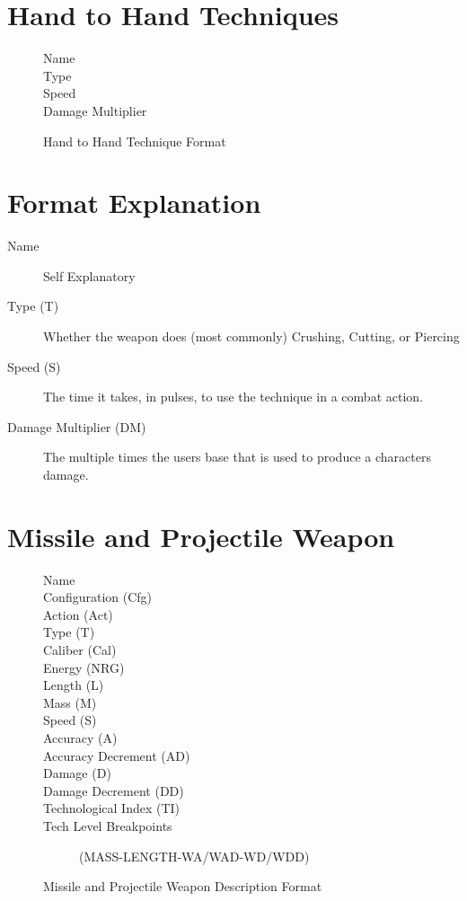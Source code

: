 \clearpage
\section{Hand to Hand Techniques}

\begin{figure}[hb]
\centering
\caption{Hand to Hand Technique Format}
	\begin{description}
		\item[Name]
		\item[Type]
		\item[Speed]
		\item[Damage Multiplier]
	\end{description}
\end{figure}

\section{Format Explanation}

\begin{description}
	\item[Name]
	Self Explanatory
	\item[Type (T)]
	Whether the weapon does (most commonly) Crushing, Cutting, or Piercing
	\item[Speed (S)]
	The time it takes, in pulses, to use the technique in a combat action.
	\item[Damage Multiplier (DM)]
	The multiple times the users base that is used to produce a characters
	damage.
\end{description}

\clearpage
\section{Missile and Projectile Weapon}

\begin{figure}[hb]
\centering
\caption{Missile and Projectile Weapon Description Format}
	\begin{description}
		\item[Name]
		\item[Configuration (Cfg)]
		\item[Action (Act)]
		\item[Type (T)]
		\item[Caliber (Cal)]
		\item[Energy (NRG)]
		\item[Length (L)]
		\item[Mass (M)]
		\item[Speed (S)]
		\item[Accuracy (A)]
		\item[Accuracy Decrement (AD)]
		\item[Damage (D)]
		\item[Damage Decrement  (DD)]
		\item[Technological Index (TI)]
		\item[Tech Level Breakpoints]
		(MASS-LENGTH-WA/WAD-WD/WDD)
	\end{description}
\end{figure}

